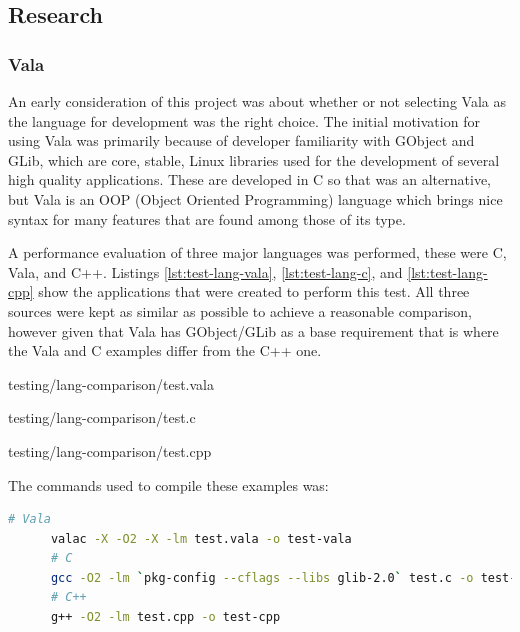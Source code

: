   \newpage
  \subsection{Research}\label{sec:results-research}

    \subsubsection{Vala}\label{sec:results-research-vala}

      An early consideration of this project was about whether or not selecting
      Vala as the language for development was the right choice. The initial
      motivation for using Vala was primarily because of developer familiarity
      with GObject and GLib, which are core, stable, Linux libraries used for
      the development of several high quality applications. These are developed
      in C so that was an alternative, but Vala is an OOP (Object Oriented
      Programming) language which brings nice syntax for many features that are
      found among those of its type.

      A performance evaluation of three major languages was performed, these
      were C, Vala, and C++. Listings \ref{lst:test-lang-vala},
      \ref{lst:test-lang-c}, and \ref{lst:test-lang-cpp} show the applications
      that were created to perform this test. All three sources were kept as
      similar as possible to achieve a reasonable comparison, however given
      that Vala has GObject/GLib as a base requirement that is where the Vala
      and C examples differ from the C++ one.

      
                      {testing/lang-comparison/test.vala}

      \newpage
      
                      {testing/lang-comparison/test.c}

      
                      {testing/lang-comparison/test.cpp}

      The commands used to compile these examples was:

      \begin{lstlisting}[language=bash]
      # Vala
      valac -X -O2 -X -lm test.vala -o test-vala
      # C
      gcc -O2 -lm `pkg-config --cflags --libs glib-2.0` test.c -o test-c
      # C++
      g++ -O2 -lm test.cpp -o test-cpp
      \end{lstlisting}

